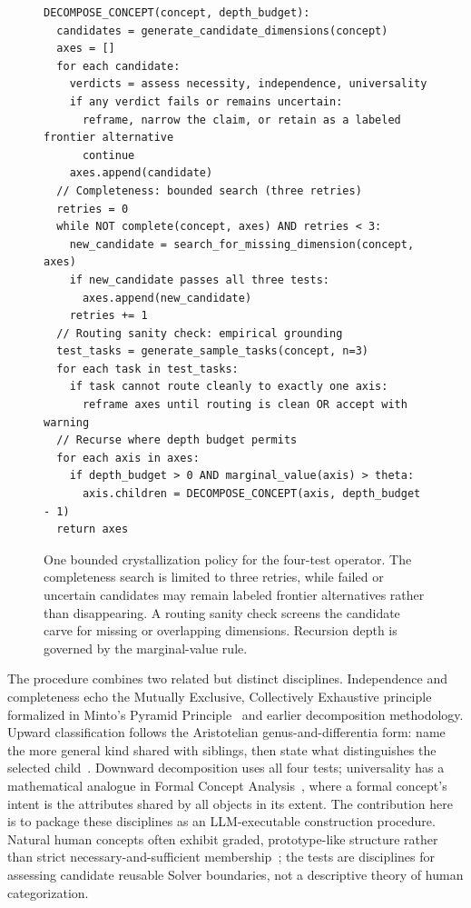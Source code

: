 \documentclass[11pt]{article}
\begin{document}
\begin{figure}[!htb]
\begin{rfbox}
\small
\begin{verbatim}
DECOMPOSE_CONCEPT(concept, depth_budget):
  candidates = generate_candidate_dimensions(concept)
  axes = []
  for each candidate:
    verdicts = assess necessity, independence, universality
    if any verdict fails or remains uncertain:
      reframe, narrow the claim, or retain as a labeled frontier alternative
      continue
    axes.append(candidate)
  // Completeness: bounded search (three retries)
  retries = 0
  while NOT complete(concept, axes) AND retries < 3:
    new_candidate = search_for_missing_dimension(concept, axes)
    if new_candidate passes all three tests:
      axes.append(new_candidate)
    retries += 1
  // Routing sanity check: empirical grounding
  test_tasks = generate_sample_tasks(concept, n=3)
  for each task in test_tasks:
    if task cannot route cleanly to exactly one axis:
      reframe axes until routing is clean OR accept with warning
  // Recurse where depth budget permits
  for each axis in axes:
    if depth_budget > 0 AND marginal_value(axis) > theta:
      axis.children = DECOMPOSE_CONCEPT(axis, depth_budget - 1)
  return axes
\end{verbatim}
\end{rfbox}
\caption{One bounded crystallization policy for the four-test operator. The completeness search is limited to three retries, while failed or uncertain candidates may remain labeled frontier alternatives rather than disappearing. A routing sanity check screens the candidate carve for missing or overlapping dimensions. Recursion depth is governed by the marginal-value rule.}
\label{fig:decompose-algorithm}
\end{figure}

The procedure combines two related but distinct disciplines. Independence and completeness echo the Mutually Exclusive, Collectively Exhaustive principle formalized in Minto's Pyramid Principle~\cite{minto1985pyramid} and earlier decomposition methodology. Upward classification follows the Aristotelian genus-and-differentia form: name the more general kind shared with siblings, then state what distinguishes the selected child~\cite{aristotle_categories}. Downward decomposition uses all four tests; universality has a mathematical analogue in Formal Concept Analysis~\cite{wille1982fca}, where a formal concept's intent is the attributes shared by all objects in its extent. The contribution here is to package these disciplines as an LLM-executable construction procedure. Natural human concepts often exhibit graded, prototype-like structure rather than strict necessary-and-sufficient membership~\cite{rosch1978principles}; the tests are disciplines for assessing candidate reusable Solver boundaries, not a descriptive theory of human categorization.
\end{document}
